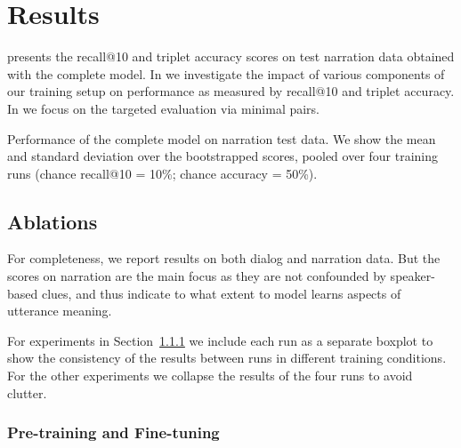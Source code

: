 \section{Results}

 presents the recall@10 and triplet accuracy
scores on test narration data obtained with the complete model.  In
 we investigate the impact of various components
of our training setup on performance as measured by recall@10 and
triplet accuracy.  In  we focus on the
targeted evaluation via minimal pairs.  

\label{sec:results}
\begin{table}[htb]
  
  \caption{Performance of the complete model on narration test
  	data. We show the mean and standard deviation over the
  	bootstrapped scores, pooled over four training runs
	(chance recall@10 = 10\%; chance accuracy = 50\%).}
  \label{tab:test_scores}
\end{table}


\subsection{Ablations}
\label{sec:ablations}
For completeness, we report results on both dialog and narration
data. But the scores on narration are the main focus as they are
not confounded by speaker-based clues, and thus indicate to what
extent to model learns aspects of utterance meaning.

For experiments in Section~\ref{sec:pretraining} we include each run as a separate boxplot
to show the consistency of the results between runs in
different training conditions.  For the other experiments we collapse
the results of the four runs to avoid clutter.

\subsubsection{Pre-training and Fine-tuning}
\label{sec:pretraining}

